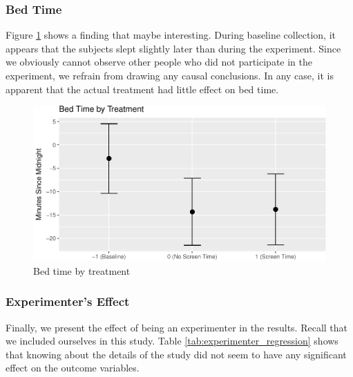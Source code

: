 \documentclass[12pt,]{article}
\begin{document}
\subsubsection{Bed Time}\label{bed-time}

Figure \ref{fig:bed_time_fig} shows a finding that maybe interesting.
During baseline collection, it appears that the subjects slept slightly
later than during the experiment. Since we obviously cannot observe
other people who did not participate in the experiment, we refrain from
drawing any causal conclusions. In any case, it is apparent that the
actual treatment had little effect on bed time.

\begin{figure}
\centering
\includegraphics{report_files/figure-latex/bed_time_fig-1.pdf}
\caption{\label{fig:bed_time_fig} Bed time by treatment}
\end{figure}

\subsubsection{Experimenter's Effect}\label{experimenters-effect}

Finally, we present the effect of being an experimenter in the results.
Recall that we included ourselves in this study. Table
\ref{tab:experimenter_regression} shows that knowing about the details
of the study did not seem to have any significant effect on the outcome
variables.
\end{document}
